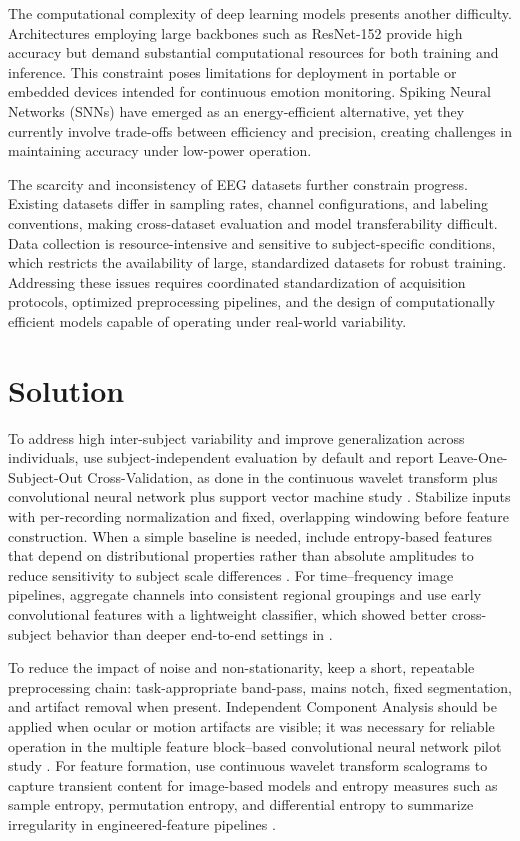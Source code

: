 \documentclass[conference]{IEEEtran}
\begin{document}
The computational complexity of deep learning models presents another difficulty. Architectures employing large backbones such as ResNet-152 \cite{Chakravarthi2022EEGHybridCNNLSTM} provide high accuracy but demand substantial computational resources for both training and inference. This constraint poses limitations for deployment in portable or embedded devices intended for continuous emotion monitoring. Spiking Neural Networks (SNNs) \cite{Luo2020SNN_EEGEmotion} have emerged as an energy-efficient alternative, yet they currently involve trade-offs between efficiency and precision, creating challenges in maintaining accuracy under low-power operation.

The scarcity and inconsistency of EEG datasets further constrain progress. Existing datasets differ in sampling rates, channel configurations, and labeling conventions, making cross-dataset evaluation and model transferability difficult. Data collection is resource-intensive and sensitive to subject-specific conditions, which restricts the availability of large, standardized datasets for robust training. Addressing these issues requires coordinated standardization of acquisition protocols, optimized preprocessing pipelines, and the design of computationally efficient models capable of operating under real-world variability.


\section{Solution}
To address high inter-subject variability and improve generalization across individuals, use subject-independent evaluation by default and report Leave-One-Subject-Out Cross-Validation, as done in the continuous wavelet transform plus convolutional neural network plus support vector machine study \cite{Bagherzadeh2023HybridEEGWaveletCNN_SVM}. Stabilize inputs with per-recording normalization and fixed, overlapping windowing before feature construction. When a simple baseline is needed, include entropy-based features that depend on distributional properties rather than absolute amplitudes to reduce sensitivity to subject scale differences \cite{Patel2021EEGEntropyReview}. For time–frequency image pipelines, aggregate channels into consistent regional groupings and use early convolutional features with a lightweight classifier, which showed better cross-subject behavior than deeper end-to-end settings in \cite{Bagherzadeh2023HybridEEGWaveletCNN_SVM}.

To reduce the impact of noise and non-stationarity, keep a short, repeatable preprocessing chain: task-appropriate band-pass, mains notch, fixed segmentation, and artifact removal when present. Independent Component Analysis should be applied when ocular or motion artifacts are visible; it was necessary for reliable operation in the multiple feature block–based convolutional neural network pilot study \cite{Lee2020MFB_CNN_PilotMentalStates}. For feature formation, use continuous wavelet transform scalograms to capture transient content for image-based models \cite{Bagherzadeh2023HybridEEGWaveletCNN_SVM} and entropy measures such as sample entropy, permutation entropy, and differential entropy to summarize irregularity in engineered-feature pipelines \cite{Patel2021EEGEntropyReview}.
\end{document}
